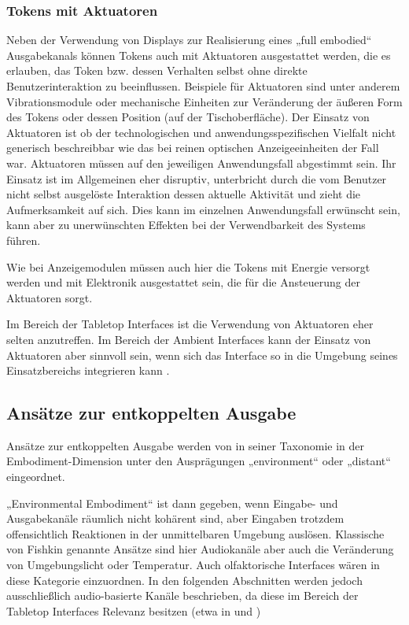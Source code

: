 
\subsubsection{Tokens mit Aktuatoren} %
\label{ssub:tokens_mit_aktuatoren}

Neben der Verwendung von Displays zur Realisierung eines „full embodied“ Ausgabekanals können Tokens auch mit Aktuatoren ausgestattet werden, die es erlauben, das Token bzw. dessen Verhalten selbst ohne direkte Benutzerinteraktion zu beeinflussen. Beispiele für Aktuatoren sind unter anderem Vibrationsmodule oder mechanische Einheiten zur Veränderung der äußeren Form des Tokens oder dessen Position (auf der Tischoberfläche). Der Einsatz von Aktuatoren ist ob der technologischen und anwendungsspezifischen Vielfalt nicht generisch beschreibbar wie das bei reinen optischen Anzeigeeinheiten der Fall war. Aktuatoren müssen auf den jeweiligen Anwendungsfall abgestimmt sein. Ihr Einsatz ist im Allgemeinen eher disruptiv, unterbricht durch die vom Benutzer nicht selbst ausgelöste Interaktion dessen aktuelle Aktivität und zieht die Aufmerksamkeit auf sich. Dies kann im einzelnen Anwendungsfall erwünscht sein, kann aber zu unerwünschten Effekten bei der Verwendbarkeit des Systems führen.

Wie bei Anzeigemodulen müssen auch hier die Tokens mit Energie versorgt werden und mit Elektronik ausgestattet sein, die für die Ansteuerung der Aktuatoren sorgt.

Im Bereich der Tabletop Interfaces ist die Verwendung von Aktuatoren eher selten anzutreffen. Im Bereich der Ambient Interfaces kann der Einsatz von Aktuatoren aber sinnvoll sein, wenn sich das Interface so in die Umgebung seines Einsatzbereichs integrieren kann \citep{Gross03}.


\subsection{Ansätze zur entkoppelten Ausgabe} %
\label{sub:entkoppelte_ausgabe}

Ansätze zur entkoppelten Ausgabe werden von \citet{Fishkin04} in seiner Taxonomie in der Embodiment-Dimension unter den Ausprägungen „environment“ oder „distant“ eingeordnet. 

„Environmental Embodiment“ ist dann gegeben, wenn Eingabe- und Ausgabekanäle räumlich nicht kohärent sind, aber Eingaben trotzdem offensichtlich Reaktionen in der unmittelbaren Umgebung auslösen. Klassische von Fishkin genannte Ansätze sind hier Audiokanäle aber auch die Veränderung von Umgebungslicht oder Temperatur. Auch olfaktorische Interfaces wären in diese Kategorie einzuordnen. In den folgenden Abschnitten werden jedoch ausschließlich audio-basierte Kanäle beschrieben, da diese im Bereich der Tabletop Interfaces Relevanz besitzen (etwa in \citep{Kaltenbrunner06} und \citep{Pedersen09})

